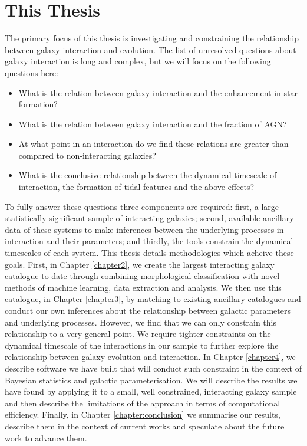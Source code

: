 \section{This Thesis}
\noindent The primary focus of this thesis is investigating and constraining the relationship between galaxy interaction and evolution. The list of unresolved questions about galaxy interaction is long and complex, but we will focus on the following questions here:

\begin{itemize}
	\item What is the relation between galaxy interaction and the enhancement in star formation?
	\item What is the relation between galaxy interaction and the fraction of AGN?
	\item At what point in an interaction do we find these relations are greater than compared to non-interacting galaxies?
	\item What is the conclusive relationship between the dynamical timescale of interaction, the formation of tidal features and the above effects?
\end{itemize}

To fully answer these questions three components are required: first, a large statistically significant sample of interacting galaxies; second, available ancillary data of these systems to make inferences between the underlying processes in interaction and their parameters; and thirdly, the tools constrain the dynamical timescales of each system. This thesis details methodologies which acheive these goals. First, in Chapter \ref{chapter2}, we create the largest interacting galaxy catalogue to date through combining morphological classification with novel methods of machine learning, data extraction and analysis. We then use this catalogue, in Chapter \ref{chapter3}, by matching to existing ancillary catalogues and conduct our own inferences about the relationship between galactic parameters and underlying processes. However, we find that we can only constrain this relationship to a very general point. We require tighter constraints on the dynamical timescale of the interactions in our sample to further explore the relationship between galaxy evolution and interaction. In Chapter \ref{chapter4},  we describe software we have built that will conduct such constraint in the context of Bayesian statistics and galactic parameterisation. We will describe the results we have found by applying it to a small, well constrained, interacting galaxy sample and then describe the limitations of the approach in terms of computational efficiency. Finally, in Chapter \ref{chapter:conclusion} we summarise our results, describe them in the context of current works and speculate about the future work to advance them.

